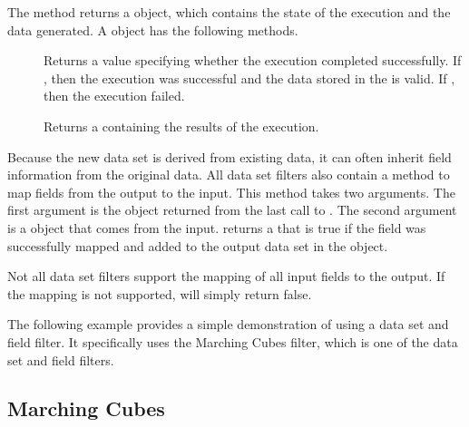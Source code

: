 The  method returns a  object,
which contains the state of the execution and the data generated. A
 object has the following methods.

\begin{description}
\item[] Returns a  value specifying
  whether the execution completed successfully. If , then
  the execution was successful and the data stored in the
   is valid. If , then the
  execution failed.
\item[] Returns a  containing
  the results of the execution.
\end{description}

Because the new data set is derived from existing data, it can often
inherit field information from the original data. All data set filters also
contain a  method to map fields from the
output to the input. This method takes two arguments. The first argument is
the  object returned from the last call to
. The second argument is a  object that
comes from the input.  returns a
 that is true if the field was successfully mapped and added
to the output data set in the  object.

\begin{commonerrors}
  Not all data set filters support the mapping of all input fields to the
  output. If the mapping is not supported, 
  will simply return false.
\end{commonerrors}

The following example provides a simple demonstration of using a data set
and field filter. It specifically uses the Marching Cubes filter, which is
one of the data set and field filters.


\subsection{Marching Cubes}


